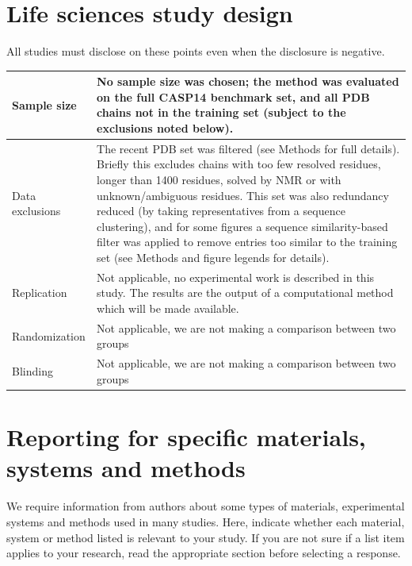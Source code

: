 \documentclass[10pt]{article}
\begin{document}
\section*{Life sciences study design}
All studies must disclose on these points even when the disclosure is negative.

\begin{center}
\begin{tabular}{|l|l|}
\hline
Sample size & No sample size was chosen; the method was evaluated on the full CASP14 benchmark set, and all PDB chains not in the training set (subject to the exclusions noted below). \\
\hline
Data exclusions & The recent PDB set was filtered (see Methods for full details). Briefly this excludes chains with too few resolved residues, longer than 1400 residues, solved by NMR or with unknown/ambiguous residues. This set was also redundancy reduced (by taking representatives from a sequence clustering), and for some figures a sequence similarity-based filter was applied to remove entries too similar to the training set (see Methods and figure legends for details). \\
\hline
Replication & Not applicable, no experimental work is described in this study. The results are the output of a computational method which will be made available. \\
\hline
Randomization & Not applicable, we are not making a comparison between two groups \\
\hline
Blinding & Not applicable, we are not making a comparison between two groups \\
\hline
\end{tabular}
\end{center}

\section*{Reporting for specific materials, systems and methods}
We require information from authors about some types of materials, experimental systems and methods used in many studies. Here, indicate whether each material, system or method listed is relevant to your study. If you are not sure if a list item applies to your research, read the appropriate section before selecting a response.
\end{document}

